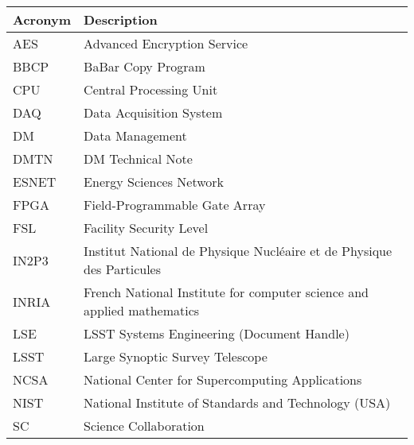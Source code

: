 \addtocounter{table}{-1}
\begin{longtable}{p{}p{}}\hline
\textbf{Acronym} & \textbf{Description}  \\\hline

AES & Advanced Encryption Service \\\hline
BBCP & BaBar Copy Program \\\hline
CPU & Central Processing Unit \\\hline
DAQ & Data Acquisition System \\\hline
DM & Data Management \\\hline
DMTN & DM Technical Note \\\hline
ESNET & Energy Sciences Network \\\hline
FPGA & Field-Programmable Gate Array \\\hline
FSL & Facility Security Level \\\hline
IN2P3 & Institut National de Physique Nucléaire et de Physique des Particules \\\hline
INRIA & French National Institute for computer science and applied mathematics \\\hline
LSE & LSST Systems Engineering (Document Handle) \\\hline
LSST & Large Synoptic Survey Telescope \\\hline
NCSA & National Center for Supercomputing Applications \\\hline
NIST & National Institute of Standards and Technology (USA) \\\hline
SC & Science Collaboration \\\hline
\end{longtable}
